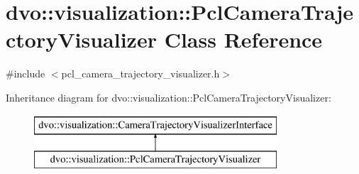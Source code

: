 \hypertarget{classdvo_1_1visualization_1_1_pcl_camera_trajectory_visualizer}{}\section{dvo\+:\+:visualization\+:\+:Pcl\+Camera\+Trajectory\+Visualizer Class Reference}
\label{classdvo_1_1visualization_1_1_pcl_camera_trajectory_visualizer}


{\ttfamily \#include $<$pcl\+\_\+camera\+\_\+trajectory\+\_\+visualizer.\+h$>$}

Inheritance diagram for dvo\+:\+:visualization\+:\+:Pcl\+Camera\+Trajectory\+Visualizer\+:\begin{figure}[H]
\begin{center}
\leavevmode
\includegraphics[height=2.000000cm]{classdvo_1_1visualization_1_1_pcl_camera_trajectory_visualizer}
\end{center}
\end{figure}
